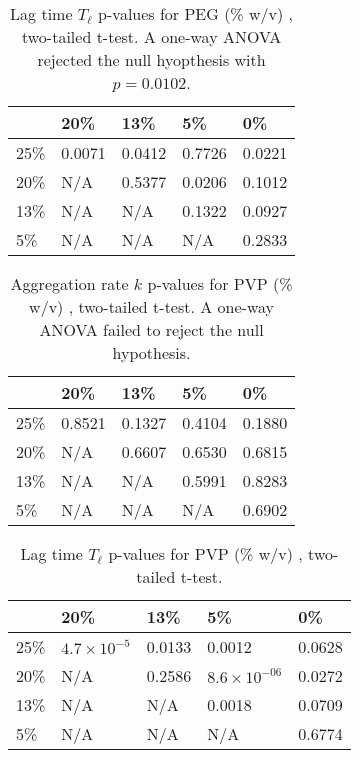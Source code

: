 \begin{table}[b!]
  \caption[Lag time p-values for PEG.]{Lag time $T_\ell$ p-values for PEG (\% w/v) , two-tailed t-test. A one-way ANOVA rejected the null hyopthesis with $p=0.0102$.}
    \label{table:p-tl-values-peg}
    \begin{tabular}{p{2cm}|p{3cm}p{3cm}p{3cm}p{3cm}}
        &20\% &  13\% & 5\% & 0\% \\ \hline
	25\% & 0.0071 & 0.0412 & 0.7726 &0.0221\\
	20\% & N/A &0.5377 &  0.0206 & 0.1012\\
     	13\% & N/A  & N/A & 0.1322 & 0.0927\\
      	5\% & N/A & N/A  & N/A &0.2833\\
    \end{tabular}
\end{table}

\begin{table}[b!]
  \caption[Aggregation rate p-values for PVP.]{Aggregation rate $k$ p-values for PVP (\% w/v) , two-tailed t-test. A one-way ANOVA failed to reject the null hypothesis.}
    \label{table:p-k-values-pvp}
    \begin{tabular}{p{2cm}|p{3cm}p{3cm}p{3cm}p{3cm}}
        &20\% &  13\% & 5\% & 0\% \\ \hline
	25\% & 0.8521 & 0.1327 & 0.4104 &0.1880\\
	20\% & N/A &0.6607 & 0.6530 & 0.6815\\
     	13\% & N/A  & N/A & 0.5991 & 0.8283\\
      	5\% & N/A & N/A  & N/A & 0.6902\\
    \end{tabular}
\end{table}

\begin{table}[b!]
  \caption[Lag time p-values for PVP.]{Lag time $T_\ell$ p-values for PVP (\% w/v) , two-tailed t-test.}
    \label{table:p-tl-values-pvp}
    \begin{tabular}{p{2cm}|p{3cm}p{3cm}p{3cm}p{3cm}}
        &20\% &  13\% & 5\% & 0\% \\ \hline
	25\% & $4.7\times 10^{-5}$ & 0.0133 & 0.0012 &0.0628\\
	20\% & N/A &0.2586 &  $8.6\times 10^{-06}$ & 0.0272\\
     	13\% & N/A  & N/A & 0.0018 & 0.0709\\
      	5\% & N/A & N/A  & N/A &0.6774\\
    \end{tabular}
\end{table}